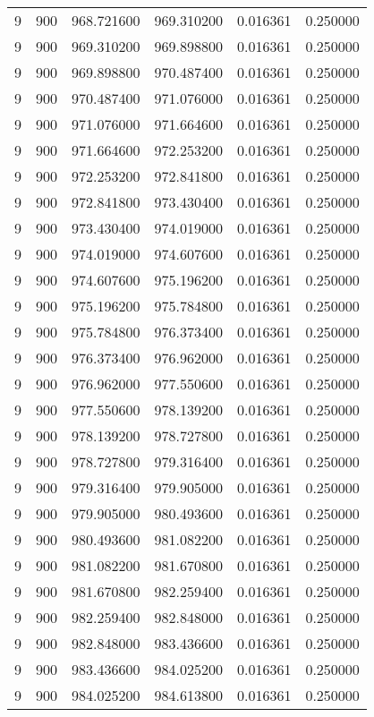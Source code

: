 \begin{longtable}{rrrrrr}
9 & 900 & 968.721600 & 969.310200 & 0.016361 & 0.250000 \\
9 & 900 & 969.310200 & 969.898800 & 0.016361 & 0.250000 \\
9 & 900 & 969.898800 & 970.487400 & 0.016361 & 0.250000 \\
9 & 900 & 970.487400 & 971.076000 & 0.016361 & 0.250000 \\
9 & 900 & 971.076000 & 971.664600 & 0.016361 & 0.250000 \\
9 & 900 & 971.664600 & 972.253200 & 0.016361 & 0.250000 \\
9 & 900 & 972.253200 & 972.841800 & 0.016361 & 0.250000 \\
9 & 900 & 972.841800 & 973.430400 & 0.016361 & 0.250000 \\
9 & 900 & 973.430400 & 974.019000 & 0.016361 & 0.250000 \\
9 & 900 & 974.019000 & 974.607600 & 0.016361 & 0.250000 \\
9 & 900 & 974.607600 & 975.196200 & 0.016361 & 0.250000 \\
9 & 900 & 975.196200 & 975.784800 & 0.016361 & 0.250000 \\
9 & 900 & 975.784800 & 976.373400 & 0.016361 & 0.250000 \\
9 & 900 & 976.373400 & 976.962000 & 0.016361 & 0.250000 \\
9 & 900 & 976.962000 & 977.550600 & 0.016361 & 0.250000 \\
9 & 900 & 977.550600 & 978.139200 & 0.016361 & 0.250000 \\
9 & 900 & 978.139200 & 978.727800 & 0.016361 & 0.250000 \\
9 & 900 & 978.727800 & 979.316400 & 0.016361 & 0.250000 \\
9 & 900 & 979.316400 & 979.905000 & 0.016361 & 0.250000 \\
9 & 900 & 979.905000 & 980.493600 & 0.016361 & 0.250000 \\
9 & 900 & 980.493600 & 981.082200 & 0.016361 & 0.250000 \\
9 & 900 & 981.082200 & 981.670800 & 0.016361 & 0.250000 \\
9 & 900 & 981.670800 & 982.259400 & 0.016361 & 0.250000 \\
9 & 900 & 982.259400 & 982.848000 & 0.016361 & 0.250000 \\
9 & 900 & 982.848000 & 983.436600 & 0.016361 & 0.250000 \\
9 & 900 & 983.436600 & 984.025200 & 0.016361 & 0.250000 \\
9 & 900 & 984.025200 & 984.613800 & 0.016361 & 0.250000 \\

\end{longtable}
